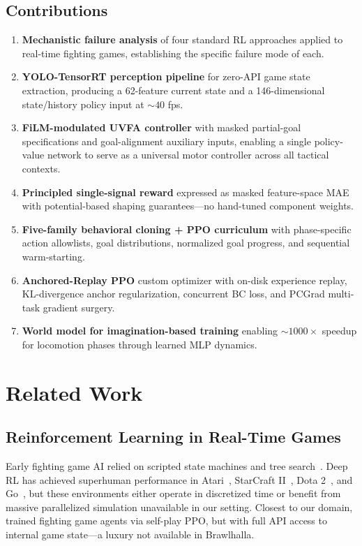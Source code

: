 \documentclass[11pt,a4paper]{article}
\begin{document}
\subsection{Contributions}
\begin{enumerate}[leftmargin=1.5em]
    \item \textbf{Mechanistic failure analysis} of four standard RL approaches applied to real-time fighting games, establishing the specific failure mode of each.
    \item \textbf{YOLO-TensorRT perception pipeline} for zero-API game state extraction, producing a 62-feature current state and a 146-dimensional state/history policy input at ${\sim}40$ fps.
    \item \textbf{FiLM-modulated UVFA controller} with masked partial-goal specifications and goal-alignment auxiliary inputs, enabling a single policy-value network to serve as a universal motor controller across all tactical contexts.
    \item \textbf{Principled single-signal reward} expressed as masked feature-space MAE with potential-based shaping guarantees---no hand-tuned component weights.
    \item \textbf{Five-family behavioral cloning + PPO curriculum} with phase-specific action allowlists, goal distributions, normalized goal progress, and sequential warm-starting.
    \item \textbf{Anchored-Replay PPO} custom optimizer with on-disk experience replay, KL-divergence anchor regularization, concurrent BC loss, and PCGrad multi-task gradient surgery.
    \item \textbf{World model for imagination-based training} enabling ${\sim}1000\times$ speedup for locomotion phases through learned MLP dynamics.
\end{enumerate}

\section{Related Work}
\label{sec:related}

\subsection{Reinforcement Learning in Real-Time Games}
Early fighting game AI relied on scripted state machines and tree search~\cite{barriga2019survey}.
Deep RL has achieved superhuman performance in Atari~\cite{mnih2015human}, StarCraft II~\cite{vinyals2019grandmaster}, Dota 2~\cite{berner2019dota}, and Go~\cite{silver2016mastering}, but these environments either operate in discretized time or benefit from massive parallelized simulation unavailable in our setting.
Closest to our domain, \citet{zhao2020winning} trained fighting game agents via self-play PPO, but with full API access to internal game state---a luxury not available in Brawlhalla.
\end{document}
